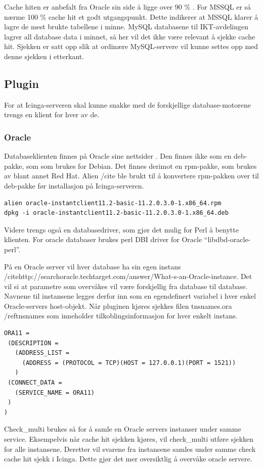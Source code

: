 Cache hiten er anbefalt fra Oracle sin side å ligge over 90 \% \cite{oraclecachehit}. 
For MSSQL er så nærme 100 \% cache hit et godt utgangspunkt. Dette indikerer at MSSQL klarer å lagre de mest brukte tabellene i minne. \cite{sqlmonitoring}
MySQL databasene til IKT-avdelingen lagrer all database data i minnet, så her vil det ikke være relevant å sjekke cache hit. Sjekken er satt opp slik at ordinære MySQL-servere vil kunne settes opp med denne sjekken i etterkant.

\subsection{Plugin} %
For at Icinga-serveren skal kunne snakke med de forskjellige database-motorene trengs en klient for hver av de. 

\subsubsection{Oracle}
Databaseklienten finnes på Oracle sine nettsider \cite{oracleclient}. Den finnes ikke som en deb-pakke, som som brukes for Debian. Det finnes derimot en rpm-pakke, som brukes av blant annet Red Hat. Alien /cite\cite{debian:alien} ble brukt til å konvertere rpm-pakken over til deb-pakke før installasjon på Icinga-serveren. 
\begin{lstlisting}
alien oracle-instantclient11.2-basic-11.2.0.3.0-1.x86_64.rpm 
dpkg -i oracle-instantclient11.2-basic-11.2.0.3.0-1.x86_64.deb
\end{lstlisting}
Videre trengs også en databasedriver, som gjør det mulig for Perl å benytte klienten. For oracle databaser brukes perl DBI driver for Oracle “libdbd-oracle-perl”.

På en Oracle server vil hver database ha sin egen instans /cite{http://searchoracle.techtarget.com/answer/What-s-an-Oracle-instance}. Det vil si at parametre som overvåkes vil være forskjellig fra database til database. Navnene til instansene legges derfor inn som en egendefinert variabel i hver enkel Oracle-servers host-objekt. Når pluginen kjøres sjekkes filen tnsnames.ora /ref{tnsnames} som inneholder tilkoblingsinformasjon for hver enkelt instans.
\begin{lstlisting}
ORA11 =
 (DESCRIPTION = 
   (ADDRESS_LIST =
     (ADDRESS = (PROTOCOL = TCP)(HOST = 127.0.0.1)(PORT = 1521))
   )
 (CONNECT_DATA =
   (SERVICE_NAME = ORA11)
 )
)
\end{lstlisting}
Check\_multi brukes så for å samle en Oracle servers instanser under samme service. Eksempelvis når cache hit sjekken kjøres, vil check\_multi utføre sjekken for alle instansene. Deretter vil svarene fra instansene samles under samme check cache hit sjekk i Icinga. Dette gjør det mer oversiktlig å overvåke oracle servere.

